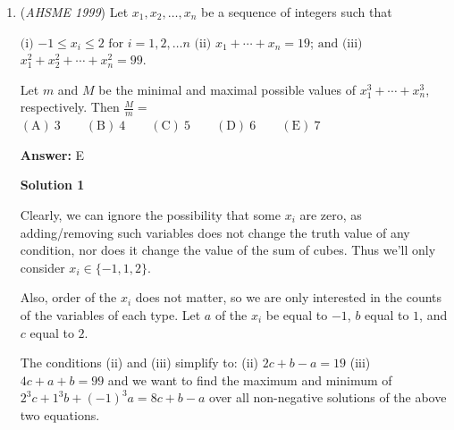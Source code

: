 \begin{enumerate}
 Thus $\frac 12 = \sin A \cos B + \sin B \cos A$. This is the sine addition identity, so $\frac 12 = \sin (A + B) = \sin (180 - C) = \sin C$. Thus either $C = 30^{\circ}, 150^{\circ}$. 

 If $C = 150$, then $A + B = 30 \Longrightarrow A,B < 30$, and $\sin A < \frac 12, \cos A < 1$. The first equation implies $6 = 3 \sin A + 4\cos B < 3\left(\frac 12\right) + 4(1) = 5.5 < 6$, which is a contradiction; thus $C = 30 \Longrightarrow \mathrm{(A)}$.

 \textbf{Supplement} Adding the two given equations gives $3(\sin A + \cos A)+4(\sin B + \cos B) =7$

 If $A+B = 30^{\circ}$, then $A$ and $B$ are both acute. When $A$ and $B$ are both acute, $\sin A + \cos A > 1$ and $\sin B + \cos B>1$. Then $3(\sin A + \cos A)+4(\sin B + \cos B) >7$. This contradicts the equation $3(\sin A + \cos A)+4(\sin B + \cos B) =7$. Therefore, $A+B \neq 30^{\circ}$, so $A+B = 150^{\circ}$ and $C = 30^{\circ}$.

 


	\item (\textit{AHSME 1999}) Let $x_1, x_2, \ldots , x_n$ be a sequence of integers such that


 $\text{(i)}$ $-1 \le x_i \le 2$ $\text{for}$ $i = 1,2, \ldots n$
$\text{(ii)}$ $x_1 + \cdots + x_n = 19$; $\text{and}$
$\text{(iii)}$ $x_1^2 + x_2^2 + \cdots + x_n^2 = 99$.


 Let $m$ and $M$ be the minimal and maximal possible values of $x_1^3 + \cdots + x_n^3$, respectively. Then $\frac Mm =$
$\mathrm{(A) \ }3 \qquad \mathrm{(B) \ }4 \qquad \mathrm{(C) \ }5 \qquad \mathrm{(D) \ }6 \qquad \mathrm{(E) \ }7$

 \textbf{Answer: }E



\textbf{Solution 1}

Clearly, we can ignore the possibility that some $x_i$ are zero, as adding/removing such variables does not change the truth value of any condition, nor does it change the value of the sum of cubes. Thus we'll only consider $x_i\in\{-1,1,2\}$. 

 Also, order of the $x_i$ does not matter, so we are only interested in the counts of the variables of each type. Let $a$ of the $x_i$ be equal to $-1$, $b$ equal to $1$, and $c$ equal to $2$.

 The conditions (ii) and (iii) simplify to: 
(ii) $2c + b - a = 19$ 
(iii) $4c + a + b = 99$ 
and we want to find the maximum and minimum of $2^3c + 1^3b + (-1)^3a = 8c + b - a$ over all non-negative solutions of the above two equations.


\end{enumerate}
